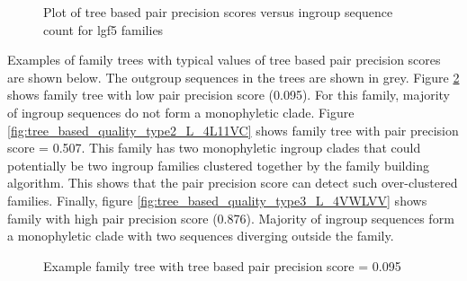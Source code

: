 \documentclass{article}
\begin{document}
		\begin{figure}[h!]
			\caption{Plot of tree based pair precision scores versus ingroup sequence count for lgf5 families}
			\label{fig:scatter_tree_precision_vs_seqct_lgf5}
		\end{figure}
		
		Examples of family trees with typical values of tree based pair precision scores are shown below. The outgroup sequences in the trees are shown in grey. Figure \ref{fig:tree_based_quality_type1_L_J5W12Z} shows family tree with low pair precision score (0.095). For this family, majority of ingroup sequences do not form a monophyletic clade. Figure \ref{fig:tree_based_quality_type2_L_4L11VC} shows family tree with pair precision score = 0.507. This family has two monophyletic ingroup clades that could potentially be two ingroup families clustered together by the family building algorithm. This shows that the pair precision score can detect such over-clustered families. Finally, figure \ref{fig:tree_based_quality_type3_L_4VWLVV} shows family with high pair precision score (0.876). Majority of ingroup  sequences form a monophyletic clade with two sequences diverging outside the family.
		
			
		\begin{figure}[h!]
			\caption{Example family tree with tree based pair precision score = 0.095}
			\label{fig:tree_based_quality_type1_L_J5W12Z}
		\end{figure}
		
\end{document}
